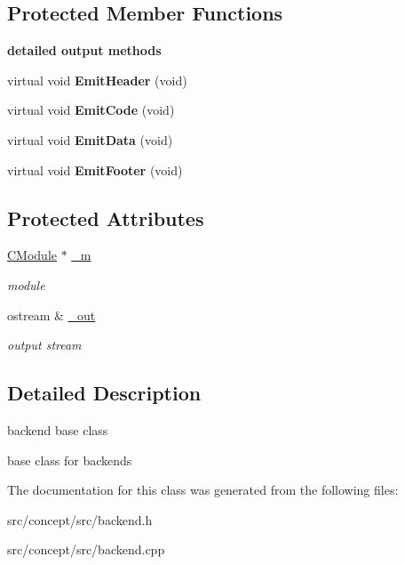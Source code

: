 \subsection*{Protected Member Functions}
\begin{Indent}{\bf detailed output methods}\par
\begin{DoxyCompactItemize}
\item 
\hypertarget{classCBackend_a4356421b643f84dc9022b27fbc33d669}{virtual void {\bfseries Emit\-Header} (void)}\label{classCBackend_a4356421b643f84dc9022b27fbc33d669}

\item 
\hypertarget{classCBackend_a24d99143c6f7f046935d301aceb109aa}{virtual void {\bfseries Emit\-Code} (void)}\label{classCBackend_a24d99143c6f7f046935d301aceb109aa}

\item 
\hypertarget{classCBackend_aab9945b71a0c2b58b2440ad8c4ee16cc}{virtual void {\bfseries Emit\-Data} (void)}\label{classCBackend_aab9945b71a0c2b58b2440ad8c4ee16cc}

\item 
\hypertarget{classCBackend_a9e5e9768794e1c2ab8a4be49004f3585}{virtual void {\bfseries Emit\-Footer} (void)}\label{classCBackend_a9e5e9768794e1c2ab8a4be49004f3585}

\end{DoxyCompactItemize}
\end{Indent}
\subsection*{Protected Attributes}
\begin{DoxyCompactItemize}
\item 
\hypertarget{classCBackend_af629d0f005c02c5cac8ebd68e73ea673}{\hyperlink{classCModule}{C\-Module} $\ast$ \hyperlink{classCBackend_af629d0f005c02c5cac8ebd68e73ea673}{\-\_\-m}}\label{classCBackend_af629d0f005c02c5cac8ebd68e73ea673}

\begin{DoxyCompactList}\small\item\em module \end{DoxyCompactList}\item 
\hypertarget{classCBackend_a9b14a92255883447f05129d971ed069d}{ostream \& \hyperlink{classCBackend_a9b14a92255883447f05129d971ed069d}{\-\_\-out}}\label{classCBackend_a9b14a92255883447f05129d971ed069d}

\begin{DoxyCompactList}\small\item\em output stream \end{DoxyCompactList}\end{DoxyCompactItemize}


\subsection{Detailed Description}
backend base class 

base class for backends 

The documentation for this class was generated from the following files\-:\begin{DoxyCompactItemize}
\item 
src/concept/src/backend.\-h\item 
src/concept/src/backend.\-cpp\end{DoxyCompactItemize}
